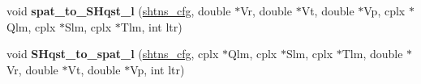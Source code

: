 \begin{DoxyCompactItemize}
\item 
\hypertarget{group__sht_gaed306c5bdee05158afab06f621137030}{}void {\bfseries spat\+\_\+to\+\_\+\+S\+Hqst\+\_\+l} (\hyperlink{shtns_8h_ab7bd78e5cbeb4ed18782d018195fde00}{shtns\+\_\+cfg}, double $\ast$Vr, double $\ast$Vt, double $\ast$Vp, cplx $\ast$Qlm, cplx $\ast$Slm, cplx $\ast$Tlm, int ltr)\label{group__sht_gaed306c5bdee05158afab06f621137030}

\item 
\hypertarget{group__sht_gac73a41ba03dc3db8bdcffd0c14cb6562}{}void {\bfseries S\+Hqst\+\_\+to\+\_\+spat\+\_\+l} (\hyperlink{shtns_8h_ab7bd78e5cbeb4ed18782d018195fde00}{shtns\+\_\+cfg}, cplx $\ast$Qlm, cplx $\ast$Slm, cplx $\ast$Tlm, double $\ast$Vr, double $\ast$Vt, double $\ast$Vp, int ltr)\label{group__sht_gac73a41ba03dc3db8bdcffd0c14cb6562}

\end{DoxyCompactItemize}
